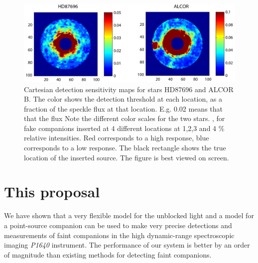 \documentclass[12pt,pdftex,preprint]{aastex}
\newcommand{\project}[1]{\textsl{#1}}
\begin{document}
\begin{figure}[h!]
\begin{center}
\includegraphics[width=6in]{figs/sens_map.pdf}
\end{center}
\vspace{-7mm}
\caption{Cartesian detection sensitivity maps for stars HD87696 and ALCOR B. The
  color shows the detection threshold at each location, as a fraction
  of the speckle flux at that location. E.g. 0.02 means that that the
  flux Note the
  different color scales for the two stars. , for fake
 companions inserted at 4 different locations at 1,2,3 and 4 \%
 relative intensities. Red corresponds to a high response, blue
 corresponds to a low response. The black rectangle shows the true location of
the inserted source. The figure is best viewed on screen. }
\label{fig:sens_map}
\end{figure}

\section{This proposal}

We have shown that a very flexible model for the unblocked light and a
model for a point-source companion can be used to make very precise
detections and measurements of faint companions in the high
dynamic-range spectroscopic imaging \project{P1640} instrument.  The
performance of our system is better by an order of magnitude than
existing methods for detecting faint companions.
\end{document}
